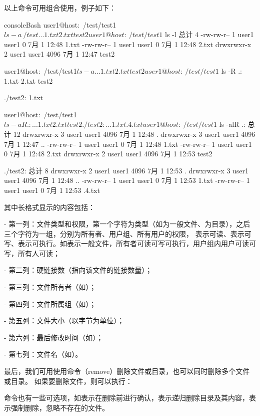 以上命令可用组合使用，例子如下：
\begin{envcode}{console}{Bash}
user1@host:~/test/test1$ ls -a ~/test
.  ..  1.txt  2.txt  test2

user1@host:~/test/test1$ ls -l
总计 4
-rw-rw-r-- 1 user1 user1    0  7月  1 12:48 1.txt
-rw-rw-r-- 1 user1 user1    0  7月  1 12:48 2.txt
drwxrwxr-x 2 user1 user1 4096  7月  1 12:47 test2

user1@host:~/test/test1$ ls -a
.  ..  1.txt  2.txt  test2

user1@host:~/test/test1$ ls -R
.:
1.txt  2.txt  test2

./test2:
1.txt

user1@host:~/test/test1$ ls -aR
.:
.  ..  1.txt  2.txt  test2

./test2:
.  ..  1.txt  .4.txt

user1@host:~/test/test1$ ls -alR
.:
总计 12
drwxrwxr-x 3 user1 user1 4096  7月  1 12:48 .
drwxrwxr-x 3 user1 user1 4096  7月  1 12:47 ..
-rw-rw-r-- 1 user1 user1    0  7月  1 12:48 1.txt
-rw-rw-r-- 1 user1 user1    0  7月  1 12:48 2.txt
drwxrwxr-x 2 user1 user1 4096  7月  1 12:53 test2

./test2:
总计 8
drwxrwxr-x 2 user1 user1 4096  7月  1 12:53 .
drwxrwxr-x 3 user1 user1 4096  7月  1 12:48 ..
-rw-rw-r-- 1 user1 user1    0  7月  1 12:53 1.txt
-rw-rw-r-- 1 user1 user1    0  7月  1 12:53 .4.txt
\end{envcode}

其中长格式显示的内容包括：

- 第一列：文件类型和权限，第一个字符为类型（如\code{-}为一般文件、为目录），之后三个字符为一组，分别为所有者、用户组、所有用户的权限，
表示可读、表示可写、表示可执行。如表示一般文件，所有者可读可写可执行，用户组内用户可读可写，所有人可读；

- 第二列：硬链接数（指向该文件的链接数量）；

- 第三列：文件所有者（如）；

- 第四列：文件所属组（如）；

- 第五列：文件大小（以字节为单位）；

- 第六列：最后修改时间（如）；

- 第七列：文件名（如）。

最后，我们可用使用命令（remove）删除文件或目录，也可以同时删除多个文件或目录。
如果要删除文件，则可以执行：
命令也有一些可选项，如表示在删除前进行确认，表示递归删除目录及其内容，表示强制删除，忽略不存在的文件。

